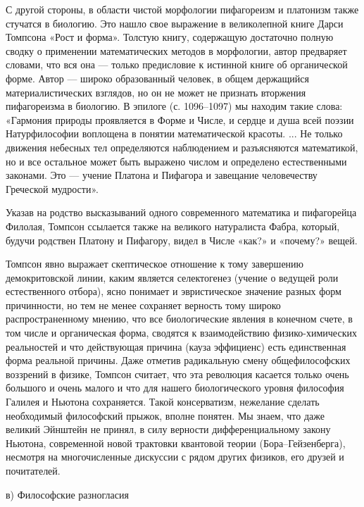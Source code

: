 С другой стороны, в области  чистой морфологии пифагореизм и платонизм
также стучатся  в биологию.  Это нашло  свое выражение  в великолепной
книге  Дарси  Томпсона  «Рост  и  форма».  Толстую  книгу,  содержащую
достаточно  полную  сводку  о   применении  математических  методов  в
морфологии,  автор   предваряет  словами,  что  вся   она  ---  только
предисловие  к  истинной  книге   об  органической  форме.  Автор  ---
широко  образованный человек,  в  общем держащийся  материалистических
взглядов,  но  он  не  может  не  признать  вторжения  пифагореизма  в
биологию. В эпилоге (с. 1096--1097)  мы находим такие слова: «Гармония
природы  проявляется в  Форме и  Числе, и  сердце и  душа всей  поэзии
Натурфилософии  воплощена в  понятии  математической  красоты. ...  Не
только движения  небесных тел определяются наблюдением  и разъясняются
математикой,  но  и  все  остальное   может  быть  выражено  числом  и
определено естественными законами. Это --- учение Платона и Пифагора и
завещание человечеству Греческой мудрости».

Указав  на  родство  высказываний  одного  современного  математика  и
пифагорейца Филолая,  Томпсон ссылается также на  великого натуралиста
Фабра,  который, будучи  родствен Платону  и Пифагору,  видел в  Числе
«как?» и «почему?» вещей.

Томпсон  явно  выражает  скептическое   отношение  к  тому  завершению
демокритовской линии,  каким является  селектогенез (учение  о ведущей
роли  естественного отбора),  ясно понимает  и эвристическое  значение
разных  форм причинности,  но  тем не  менее  сохраняет верность  тому
широко  распространенному  мнению,  что все  биологические  явления  в
конечном  счете,  в  том  числе   и  органическая  форма,  сводятся  к
взаимодействию физико-химических реальностей и что действующая причина
(кауза  эффициенс)  есть  единственная форма  реальной  причины.  Даже
отметив радикальную смену общефилософских  воззрений в физике, Томпсон
считает,  что эта  революция касается  только очень  большого и  очень
малого  и что  для нашего  биологического уровня  философия Галилея  и
Ньютона сохраняется. Такой консерватизм, нежелание сделать необходимый
философский  прыжок,  вполне  понятен.  Мы  знаем,  что  даже  великий
Эйнштейн не принял, в  силу верности дифференциальному закону Ньютона,
современной  новой  трактовки  квантовой  теории  (Бора--Гейзенберга),
несмотря  на  многочисленные дискуссии  с  рядом  других физиков,  его
друзей и почитателей.

в) Философские разногласия

